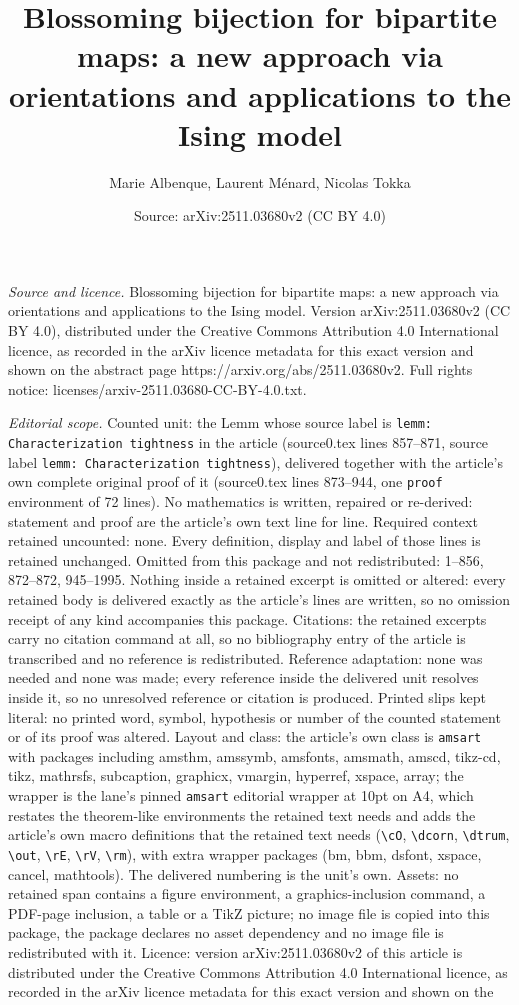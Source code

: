 \documentclass[10pt,a4paper]{amsart}
\title[Blossoming bijection for bipartite maps: a new approach via ]{Blossoming bijection for bipartite maps: a new approach via orientations and applications to the Ising model}
\author{Marie Albenque, Laurent M\'enard, Nicolas Tokka}
\date{Source: arXiv:2511.03680v2 (CC BY 4.0)}
\begin{document}
\maketitle

\noindent\emph{Source and licence.} Blossoming bijection for bipartite maps: a new approach via orientations and applications to the Ising model. Version arXiv:2511.03680v2 (CC BY 4.0), distributed under the Creative Commons Attribution 4.0 International licence, as recorded in the arXiv licence metadata for this exact version and shown on the abstract page https://arxiv.org/abs/2511.03680v2. Full rights notice: licenses/arxiv-2511.03680-CC-BY-4.0.txt.\par\smallskip

\noindent\textit{Editorial scope.} Counted unit: the Lemm whose source label is \texttt{lemm: Characterization tightness} in the article (source0.tex lines 857--871, source label \texttt{lemm: Characterization tightness}), delivered together with the article's own complete original proof of it (source0.tex lines 873--944, one \texttt{proof} environment of 72 lines). No mathematics is written, repaired or re-derived: statement and proof are the article's own text line for line. Required context retained uncounted: none. Every definition, display and label of those lines is retained unchanged. Omitted from this package and not redistributed: 1--856, 872--872, 945--1995. Nothing inside a retained excerpt is omitted or altered: every retained body is delivered exactly as the article's lines are written, so no omission receipt of any kind accompanies this package. Citations: the retained excerpts carry no citation command at all, so no bibliography entry of the article is transcribed and no reference is redistributed. Reference adaptation: none was needed and none was made; every reference inside the delivered unit resolves inside it, so no unresolved reference or citation is produced. Printed slips kept literal: no printed word, symbol, hypothesis or number of the counted statement or of its proof was altered. Layout and class: the article's own class is \texttt{amsart} with packages including amsthm, amssymb, amsfonts, amsmath, amscd, tikz-cd, tikz, mathrsfs, subcaption, graphicx, vmargin, hyperref, xspace, array; the wrapper is the lane's pinned \texttt{amsart} editorial wrapper at 10pt on A4, which restates the theorem-like environments the retained text needs and adds the article's own macro definitions that the retained text needs (\texttt{\textbackslash cO}, \texttt{\textbackslash dcorn}, \texttt{\textbackslash dtrum}, \texttt{\textbackslash out}, \texttt{\textbackslash rE}, \texttt{\textbackslash rV}, \texttt{\textbackslash rm}), with extra wrapper packages (bm, bbm, dsfont, xspace, cancel, mathtools). The delivered numbering is the unit's own. Assets: no retained span contains a figure environment, a graphics-inclusion command, a PDF-page inclusion, a table or a TikZ picture; no image file is copied into this package, the package declares no asset dependency and no image file is redistributed with it. Licence: version arXiv:2511.03680v2 of this article is distributed under the Creative Commons Attribution 4.0 International licence, as recorded in the arXiv licence metadata for this exact version and shown on the 
\end{document}
